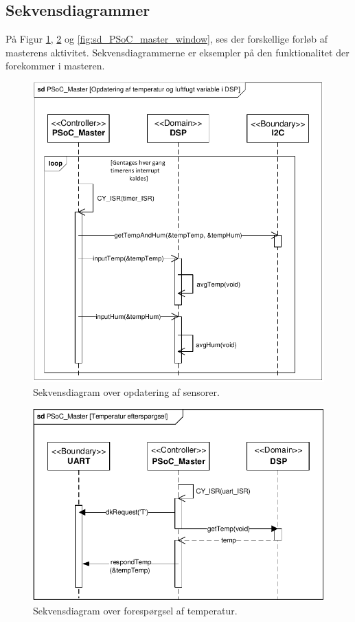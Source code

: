 
\subsection{Sekvensdiagrammer}

På Figur \ref{fig:sd_PSoC_master_sensor}, \ref{fig:sd_PSoC_master_tempreq} og \ref{fig:sd_PSoC_master_window}, ses der forskellige forløb af masterens aktivitet. Sekvensdiagrammerne er eksempler på den funktionalitet der forekommer i masteren. 

\begin{figure}[h]
\centering
\includegraphics[scale=1]{../fig/sd_PSoC_master_update_sensor_values}
\caption{Sekvensdiagram over opdatering af sensorer.}
\label{fig:sd_PSoC_master_sensor}
\end{figure}

\clearpage

\begin{figure}[h]
\centering
\includegraphics[scale=1]{../fig/sd_PSoC_master_tempreq}
\caption{Sekvensdiagram over forespørgsel af temperatur.}
\label{fig:sd_PSoC_master_tempreq}
\end{figure}

